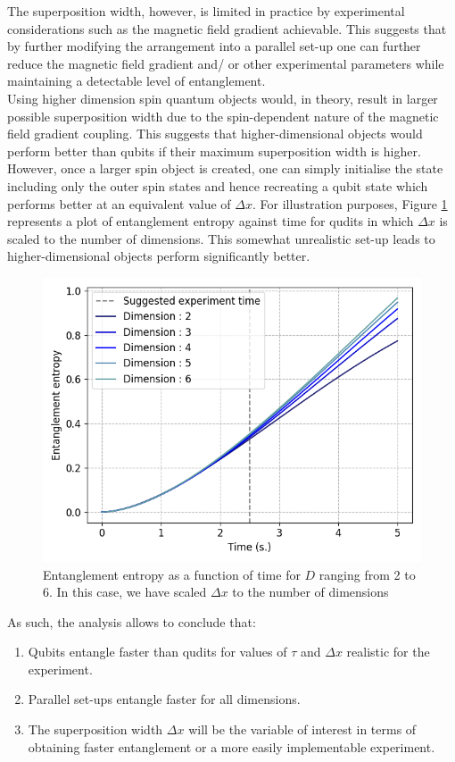\documentclass[%
 reprint,
 superscriptaddress,
 amsmath,
 amssymb,
 aps,
 longbibliography
]{revtex4-2}
\begin{document}
\begin{appendices}
\indent The superposition width, however, is limited in practice by experimental considerations such as the magnetic field gradient achievable. This suggests that by further modifying the arrangement into a parallel set-up one can further reduce the magnetic field gradient and/ or other experimental parameters while maintaining a detectable level of entanglement.\\
\indent Using higher dimension spin quantum objects would, in theory, result in larger possible superposition width due to the spin-dependent nature of the magnetic field gradient coupling. This suggests that higher-dimensional objects would perform better than qubits if their maximum superposition width is higher. However, once a larger spin object is created, one can simply initialise the state including only the outer spin states and hence recreating a qubit state which performs better at an equivalent value of $\Delta x$. For illustration purposes, Figure \ref{fig:scaling} represents a plot of entanglement entropy against time for qudits in which $\Delta x$ is scaled to the number of dimensions. This somewhat unrealistic set-up leads to higher-dimensional objects perform significantly better.

	\begin{figure}
	\centering
		\includegraphics[width=1.0\columnwidth]{para_qudits_scaling.png}
	    \caption{Entanglement entropy as a function of time for $D$ ranging from 2 to 6. In this case, we have scaled $\Delta x$ to the number of dimensions} \label{fig:scaling}
	\end{figure}

As such, the analysis allows to conclude that: 
	\begin{enumerate}
		\item Qubits entangle faster than qudits for values of $\tau$ and $\Delta x$ realistic for the experiment.
		\item Parallel set-ups entangle faster for all dimensions.
		\item The superposition width $\Delta x$ will be the variable of interest in terms of obtaining faster entanglement or a more easily implementable experiment.
	\end{enumerate}
	


\end{appendices}
\end{document}
